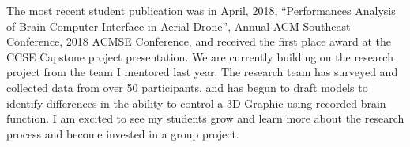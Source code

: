 \documentclass{article}
\begin{document}
\newline \newline
The most recent student publication was in April, 2018, “Performances Analysis of Brain-Computer Interface in Aerial Drone”, Annual ACM Southeast Conference, 2018 ACMSE Conference, and received the first place award at the CCSE Capstone project presentation.
\newline \newline
We  are  currently  building  on  the  research  project  from  the  team  I  mentored  last  year.  The research team has surveyed and collected data from over 50 participants, and has begun to draft models to identify differences in the ability to control a 3D Graphic using recorded brain function.  I am excited to see my students grow and learn more about the research process and become invested in a group project.
\end{document}
